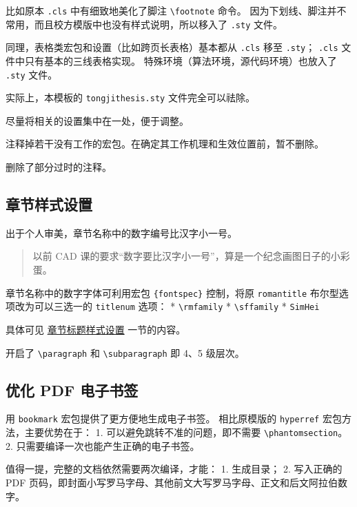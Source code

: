 \documentclass[../Main/thesis.tex]{subfiles}
\begin{document}
比如原本 \texttt{.cls} 中有细致地美化了脚注
\texttt{\textbackslash{}footnote} 命令。
因为下划线、脚注并不常用，而且校方模版中也没有样式说明，所以移入了
\texttt{.sty} 文件。

同理，表格类宏包和设置（比如跨页长表格）基本都从 \texttt{.cls} 移至
\texttt{.sty}； \texttt{.cls} 文件中只有基本的三线表格实现。
特殊环境（算法环境，源代码环境）也放入了 \texttt{.sty} 文件。

实际上，本模板的 \texttt{tongjithesis.sty} 文件完全可以祛除。

尽量将相关的设置集中在一处，便于调整。

注释掉若干没有工作的宏包。在确定其工作机理和生效位置前，暂不删除。

删除了部分过时的注释。

\subsection{章节样式设置}

出于个人审美，章节名称中的数字编号比汉字小一号。

\begin{quote}
以前 CAD 课的要求``数字要比汉字小一号''，算是一个纪念画图日子的小彩蛋。
\end{quote}

章节名称中的数字字体可利用宏包 \texttt{\{fontspec\}} 控制，将原
\texttt{romantitle} 布尔型选项改为可以三选一的 \texttt{titlenum} 选项：
* \texttt{\textbackslash{}rmfamily} * \texttt{\textbackslash{}sffamily}
* \texttt{SimHei}

具体可见
\protect\hyperlink{ux5cux25E7ux5cux25ABux5cux25A0ux5cux25E8ux5cux258Aux5cux2582ux5cux25E6ux5cux25A0ux5cux2587ux5cux25E9ux5cux25A2ux5cux2598ux5cux25E6ux5cux25A0ux5cux25B7ux5cux25E5ux5cux25BCux5cux258Fux5cux25E8ux5cux25AEux5cux25BEux5cux25E7ux5cux25BDux5cux25AE}{章节标题样式设置}
一节的内容。

开启了 \texttt{\textbackslash{}paragraph} 和
\texttt{\textbackslash{}subparagraph} 即 4、5 级层次。

\subsection{优化 PDF 电子书签}

用 \texttt{bookmark} 宏包提供了更方便地生成电子书签。 相比原模版的
\texttt{hyperref} 宏包方法，主要优势在于： 1.
可以避免跳转不准的问题，即不需要
\texttt{\textbackslash{}phantomsection}。 2.
只需要编译一次也能产生正确的电子书签。

值得一提，完整的文档依然需要两次编译，才能： 1. 生成目录； 2. 写入正确的
PDF
页码，即封面小写罗马字母、其他前文大写罗马字母、正文和后文阿拉伯数字。
\end{document}
